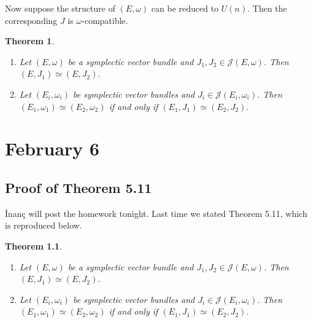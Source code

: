 \documentclass[leqno, openany]{memoir}
\newtheorem{thm}{Theorem}[chapter]
\theoremstyle{definition}
\theoremstyle{remark}
\theoremstyle{plain}
\newtheorem*{thm*}{Theorem}
\theoremstyle{definition}
\theoremstyle{remark}
\newcommand{\mc}[1]{\mathcal{#1}}
\begin{document}
Now suppose the structure of $(E, \omega)$ can be reduced to $U(n)$. Then the
corresponding $J$ is $\omega$-compatible.

\begin{thm} \begin{enumerate} \item Let $(E, \omega)$ be a symplectic vector
    bundle and $J_1, J_2 \in \mc{J}(E, \omega)$. Then $(E, J_1) \simeq (E,
    J_2)$.  \item Let $(E_i, \omega_i)$ be symplectic vector bundles and $J_i
    \in \mc{J}(E_i, \omega_i)$. Then $(E_1, \omega_1) \simeq (E_2, \omega_2)$
    if and only if $(E_1, J_1) \simeq (E_2, J_2)$.  \end{enumerate} \end{thm}

\chapter{February 6}%

\section{Proof of Theorem 5.11}%


\.Inan\c{c} will post the homework tonight. Last time we stated Theorem 5.11,
which is reproduced below.

\begin{thm*} \begin{enumerate} \item Let $(E, \omega)$ be a symplectic vector
    bundle and $J_1, J_2 \in \mc{J}(E, \omega)$. Then $(E, J_1) \simeq (E,
    J_2)$.  \item Let $(E_i, \omega_i)$ be symplectic vector bundles and $J_i
    \in \mc{J}(E_i, \omega_i)$. Then $(E_1, \omega_1) \simeq (E_2, \omega_2)$
    if and only if $(E_1, J_1) \simeq (E_2, J_2)$.  \end{enumerate} \end{thm*}
\end{document}
